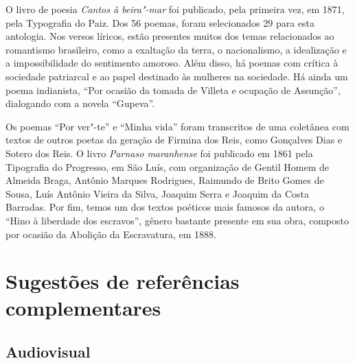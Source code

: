 \documentclass[12pt]{extarticle}
\begin{document}
O livro de poesia \emph{Cantos à beira"-mar} foi publicado, pela primeira
vez, em 1871, pela Typografia do Paiz. Dos 56 poemas, foram selecionados
29 para esta antologia. Nos versos líricos, estão presentes muitos dos
temas relacionados ao romantismo brasileiro, como a exaltação da terra,
o nacionalismo, a idealização e a impossibilidade do sentimento amoroso.
Além disso, há poemas com crítica à sociedade patriarcal e ao papel
destinado às mulheres na sociedade. Há ainda um poema indianista, ``Por
ocasião da tomada de Villeta e ocupação de Assunção'', dialogando com a
novela ``Gupeva''.

Os poemas ``Por ver"-te'' e ``Minha vida'' foram transcritos de uma
coletânea com textos de outros poetas da geração de Firmina dos Reis,
como Gonçalves Dias e Sotero dos Reis. O livro \emph{Parnaso maranhense}
foi publicado em 1861 pela Tipografia do Progresso, em São Luís, com
organização de Gentil Homem de Almeida Braga, Antônio Marques Rodrigues,
Raimundo de Brito Gomes de Sousa, Luís Antônio Vieira da Silva, Joaquim
Serra e Joaquim da Costa Barradas. Por fim, temos um dos textos poéticos
mais famosos da autora, o ``Hino à liberdade dos escravos'', gênero
bastante presente em sua obra, composto por ocasião da Abolição da
Escravatura, em 1888.

\section{Sugestões de referências complementares}

\subsection{Audiovisual}
\end{document}
